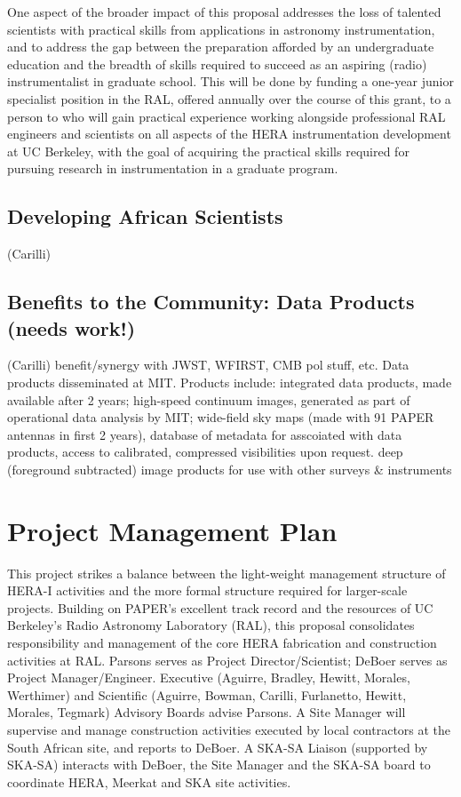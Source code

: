 \documentclass[preprint]{aastex}
\begin{document}
One aspect of the broader impact of this proposal addresses the loss of talented
scientists with practical skills from applications in astronomy
instrumentation, and to address the gap between the preparation afforded by an
undergraduate education and the breadth of skills required to succeed as an
aspiring (radio) instrumentalist in graduate school.  This will be done by
funding a one-year junior specialist position in the RAL, offered annually over the course of this grant, to a
person to who
will gain practical experience working alongside professional RAL engineers and scientists
on all aspects of the HERA instrumentation development at UC Berkeley, with the goal of
acquiring the practical skills required for
pursuing research in instrumentation in a graduate program.

\subsection{Developing African Scientists}

(Carilli)

\subsection{Benefits to the Community: Data Products (needs work!)}

(Carilli) benefit/synergy with JWST, WFIRST, CMB pol stuff, etc.
Data products disseminated at MIT.  Products include:
integrated data products, made available after 2 years;
high-speed continuum images, generated as part of operational data analysis by MIT;
wide-field sky maps (made with 91 PAPER antennas in first 2 years),
database of metadata  for asscoiated with data products,
access to calibrated, compressed visibilities upon request.
deep (foreground subtracted) image products for use with other surveys \& instruments

\section{Project Management Plan}

This project strikes a balance between the light-weight
management structure of HERA-I activities and the more formal structure
required for larger-scale projects.  Building on PAPER's excellent track record
and the resources of UC Berkeley's Radio Astronomy Laboratory (RAL),
this proposal consolidates responsibility and management of the core HERA
fabrication and construction activities at RAL. Parsons serves as
Project Director/Scientist; DeBoer serves as Project Manager/Engineer.
Executive
(Aguirre, Bradley, Hewitt, Morales, Werthimer)
and Scientific (Aguirre, Bowman, Carilli, Furlanetto, Hewitt, Morales, Tegmark) Advisory Boards advise Parsons.
A Site Manager will supervise and manage
construction activities executed by local contractors at the South African
site, and reports to DeBoer.  A SKA-SA Liaison (supported by SKA-SA)
interacts with DeBoer, the Site Manager and the SKA-SA board to
coordinate HERA, Meerkat and SKA site activities.
\end{document}
